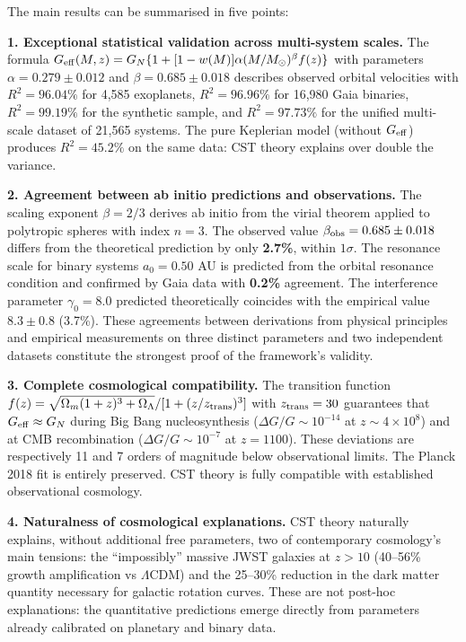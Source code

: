 \documentclass[11pt,a4paper]{article}
\begin{document}
The main results can be summarised in five points:

\textbf{1. Exceptional statistical validation across multi-system
scales.} The formula
\(G_{\rm eff}(M,z) = G_N\{1 + [1-w(M)]\alpha(M/M_\odot)^\beta f(z)\}\)
with parameters \(\alpha = 0.279 \pm 0.012\) and
\(\beta = 0.685 \pm 0.018\) describes observed orbital velocities with
\(R^2 = 96.04\%\) for 4,585 exoplanets, \(R^2 = 96.96\%\) for 16,980
Gaia binaries, \(R^2 = 99.19\%\) for the synthetic sample, and
\(R^2 = 97.73\%\) for the unified multi-scale dataset of 21,565 systems.
The pure Keplerian model (without \(G_{\rm eff}\)) produces
\(R^2 = 45.2\%\) on the same data: CST theory explains over double the
variance.

\textbf{2. Agreement between ab initio predictions and observations.}
The scaling exponent \(\beta = 2/3\) derives ab initio from the virial
theorem applied to polytropic spheres with index \(n=3\). The observed
value \(\beta_{\rm obs} = 0.685 \pm 0.018\) differs from the theoretical
prediction by only \textbf{2.7\%}, within \(1\sigma\). The resonance
scale for binary systems \(a_0 = 0.50\) AU is predicted from the orbital
resonance condition and confirmed by Gaia data with \textbf{0.2\%}
agreement. The interference parameter \(\gamma_0 = 8.0\) predicted
theoretically coincides with the empirical value \(8.3 \pm 0.8\)
(3.7\%). These agreements between derivations from physical principles
and empirical measurements on three distinct parameters and two
independent datasets constitute the strongest proof of the framework's
validity.

\textbf{3. Complete cosmological compatibility.} The transition function
\(f(z) = \sqrt{\Omega_m(1+z)^3 + \Omega_\Lambda}/[1+(z/z_{\rm trans})^3]\)
with \(z_{\rm trans} = 30\) guarantees that \(G_{\rm eff} \approx G_N\)
during Big Bang nucleosynthesis (\(\Delta G/G \sim 10^{-14}\) at
\(z \sim 4\times10^8\)) and at CMB recombination
(\(\Delta G/G \sim 10^{-7}\) at \(z = 1100\)). These deviations are
respectively 11 and 7 orders of magnitude below observational limits.
The Planck 2018 fit is entirely preserved. CST theory is fully
compatible with established observational cosmology.

\textbf{4. Naturalness of cosmological explanations.} CST theory
naturally explains, without additional free parameters, two of
contemporary cosmology's main tensions: the ``impossibly'' massive JWST
galaxies at \(z > 10\) (40--56\% growth amplification vs \(\Lambda\)CDM)
and the 25--30\% reduction in the dark matter quantity necessary for
galactic rotation curves. These are not post-hoc explanations: the
quantitative predictions emerge directly from parameters already
calibrated on planetary and binary data.
\end{document}
